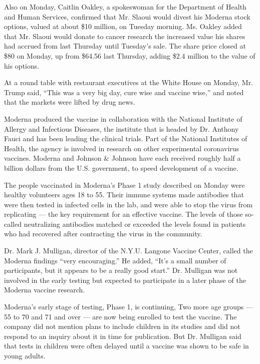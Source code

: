 Also on Monday, Caitlin Oakley, a spokeswoman for the Department of
Health and Human Services, confirmed that Mr. Slaoui would divest his
Moderna stock options, valued at about \$10 million, on Tuesday morning.
Ms. Oakley added that Mr. Slaoui would donate to cancer research the
increased value his shares had accrued from last Thursday until
Tuesday's sale. The share price closed at \$80 on Monday, up from
\$64.56 last Thursday, adding \$2.4 million to the value of his options.

At a round table with restaurant executives at the White House on
Monday, Mr. Trump said, ``This was a very big day, cure wise and vaccine
wise,'' and noted that the markets were lifted by drug news.

Moderna produced the vaccine in collaboration with the National
Institute of Allergy and Infectious Diseases, the institute that is
headed by Dr. Anthony Fauci and has been leading the clinical trials.
Part of the National Institutes of Health, the agency is involved in
research on other experimental coronavirus vaccines. Moderna and Johnson
\& Johnson have each received roughly half a billion dollars from the
U.S. government, to speed development of a vaccine.

The people vaccinated in Moderna's Phase 1 study described on Monday
were healthy volunteers ages 18 to 55. Their immune systems made
antibodies that were then tested in infected cells in the lab, and were
able to stop the virus from replicating --- the key requirement for an
effective vaccine. The levels of those so-called neutralizing antibodies
matched or exceeded the levels found in patients who had recovered after
contracting the virus in the community.

Dr. Mark J. Mulligan, director of the N.Y.U. Langone Vaccine Center,
called the Moderna findings ``very encouraging.'' He added, ``It's a
small number of participants, but it appears to be a really good
start.'' Dr. Mulligan was not involved in the early testing but expected
to participate in a later phase of the Moderna vaccine research.

Moderna's early stage of testing, Phase 1, is continuing, Two more age
groups --- 55 to 70 and 71 and over --- are now being enrolled to test
the vaccine. The company did not mention plans to include children in
its studies and did not respond to an inquiry about it in time for
publication. But Dr. Mulligan said that tests in children were often
delayed until a vaccine was shown to be safe in young adults.

